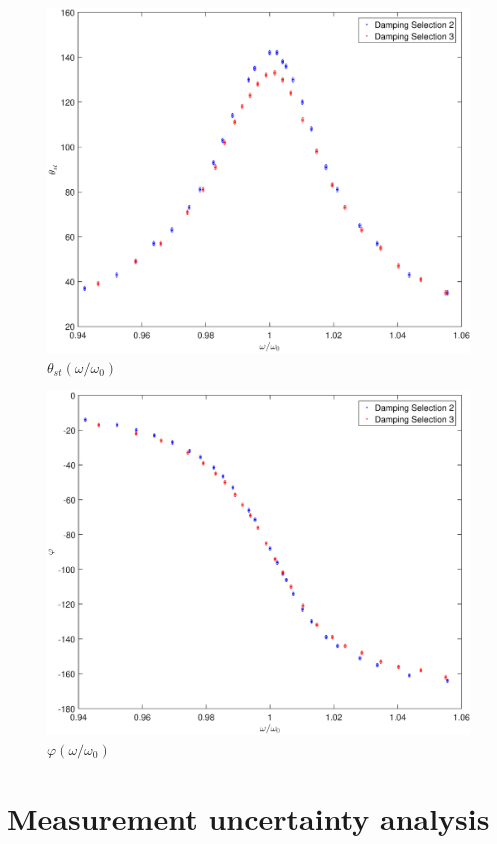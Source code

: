 \documentclass{article}
\begin{document}
\begin{figure}[!p]
	\centering
	\includegraphics[width=15cm]{fig-5.eps}
	\caption{$\theta_{st}(\omega/\omega_0)$
	\label{fig-5}}
\end{figure}


\begin{figure}[!p]
	\centering
	\includegraphics[width=15cm]{fig-6.eps}
	\caption{$\varphi(\omega/\omega_0)$
	\label{fig-6}}
\end{figure}

\newpage
\section{Measurement uncertainty analysis}
\end{document}
